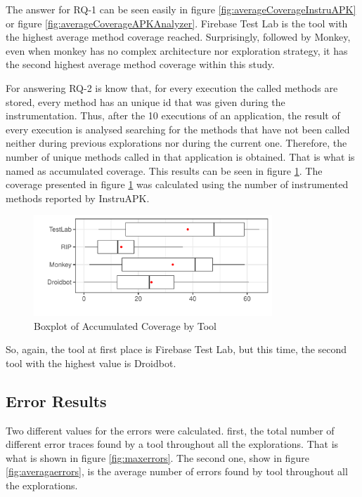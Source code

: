 The answer for RQ-1 can be seen easily in figure \ref{fig:averageCoverageInstruAPK} or figure \ref{fig:averageCoverageAPKAnalyzer}. Firebase Test Lab is the tool with the highest average method coverage reached. Surprisingly, followed by Monkey, even when monkey has no complex architecture nor exploration strategy, it has the second highest average method coverage within this study.

For answering RQ-2 is know that, for every execution the called methods are stored, every method has an unique id that was given during the instrumentation. Thus, after the 10 executions of an application, the result of every execution is analysed searching for the methods that have not been called neither during previous explorations nor during the current one. Therefore, the number of unique methods called in that application is obtained. That is what is named as accumulated coverage. This results can be seen in figure \ref{fig:boxplotAccumulated}. The coverage presented in figure \ref{fig:boxplotAccumulated} was calculated using the number of instrumented methods reported by InstruAPK. 

\begin{figure}[h]
\centering
\includegraphics[width=0.8\textwidth]{../Figures/boxplotAccumulated.pdf}
\caption{Boxplot of Accumulated Coverage by Tool}\label{fig:boxplotAccumulated}
\end{figure}

So, again, the tool at first place is Firebase Test Lab, but this time, the second tool with the highest value is Droidbot.

\subsection{Error Results}\label{sec:errorResults}

Two different values for the errors were calculated. first, the total number of different error traces found by a tool throughout all the explorations. That is what is shown in figure \ref{fig:maxerrors}. The second one, show in figure \ref{fig:averagaerrors}, is the average number of errors found by tool throughout all the explorations. 

